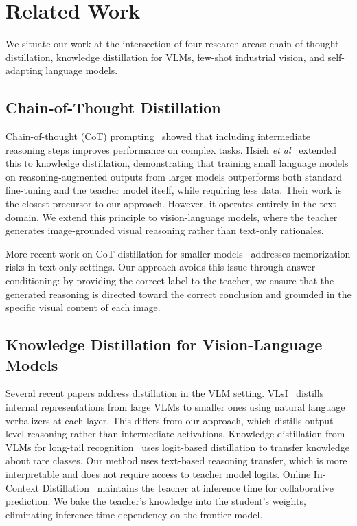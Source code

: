 \documentclass{bmvc2k}
\def\etal{\emph{et al}\bmvaOneDot}
\begin{document}
\section{Related Work}
\label{sec:related}

We situate our work at the intersection of four research areas: chain-of-thought distillation, knowledge distillation for VLMs, few-shot industrial vision, and self-adapting language models.

\subsection{Chain-of-Thought Distillation}

Chain-of-thought (CoT) prompting~\cite{wei2022chain} showed that including intermediate reasoning steps improves performance on complex tasks. Hsieh \etal~\cite{hsieh2023distilling} extended this to knowledge distillation, demonstrating that training small language models on reasoning-augmented outputs from larger models outperforms both standard fine-tuning and the teacher model itself, while requiring less data. Their work is the closest precursor to our approach. However, it operates entirely in the text domain. We extend this principle to vision-language models, where the teacher generates image-grounded visual reasoning rather than text-only rationales.

More recent work on CoT distillation for smaller models~\cite{enhancing2025cot} addresses memorization risks in text-only settings. Our approach avoids this issue through answer-conditioning: by providing the correct label to the teacher, we ensure that the generated reasoning is directed toward the correct conclusion and grounded in the specific visual content of each image.

\subsection{Knowledge Distillation for Vision-Language Models}

Several recent papers address distillation in the VLM setting. VLsI~\cite{vlsi2024verbalized} distills internal representations from large VLMs to smaller ones using natural language verbalizers at each layer. This differs from our approach, which distills output-level reasoning rather than intermediate activations. Knowledge distillation from VLMs for long-tail recognition~\cite{kd2024longtail} uses logit-based distillation to transfer knowledge about rare classes. Our method uses text-based reasoning transfer, which is more interpretable and does not require access to teacher model logits. Online In-Context Distillation~\cite{online2025incontext} maintains the teacher at inference time for collaborative prediction. We bake the teacher's knowledge into the student's weights, eliminating inference-time dependency on the frontier model.
\end{document}
